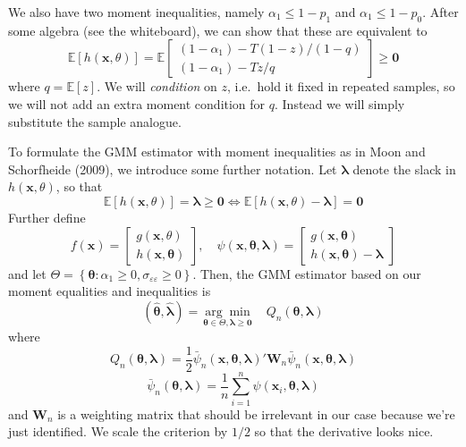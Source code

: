 \documentclass[12pt]{article}
\begin{document}
We also have two moment inequalities, namely $\alpha_1 \leq 1 - p_1$ and $\alpha_1 \leq 1 - p_0$.
After some algebra (see the whiteboard), we can show that these are equivalent to
\[
  \mathbb{E}\left[ h(\mathbf{x},\theta) \right] = \mathbb{E}
  \left[
  \begin{array}{c}
    (1 - \alpha_1) - T(1 - z)/(1 - q)\\
    (1 - \alpha_1) - Tz/q
  \end{array}
\right] \geq \mathbf{0}
\]
where $q = \mathbb{E}[z]$.
We will \emph{condition} on $z$, i.e.\ hold it fixed in repeated samples, so we will not add an extra moment condition for $q$.
Instead we will simply substitute the sample analogue.

To formulate the GMM estimator with moment inequalities as in Moon and Schorfheide (2009), we introduce some further notation.
Let $\boldsymbol{\lambda}$ denote the slack in $h(\mathbf{x}, \theta)$, so that
\[
  \mathbb{E}[h(\mathbf{x},\theta)] = \boldsymbol{\lambda} \geq \mathbf{0} \iff \mathbb{E}[h(\mathbf{x}, \theta) - \boldsymbol{\lambda}] = \mathbf{0}
\]
Further define
\[
  f(\mathbf{x}) = \left[
  \begin{array}{c}
    g(\mathbf{x},\theta) \\ h(\mathbf{x},\boldsymbol{\theta})
  \end{array}
\right], \quad
\psi(\mathbf{x}, \boldsymbol{\theta}, \boldsymbol{\lambda}) = 
\left[
\begin{array}{c}
  g(\mathbf{x}, \boldsymbol{\theta})\\
  h(\mathbf{x}, \boldsymbol{\theta}) - \boldsymbol{\lambda}
\end{array}
\right]
\]
and let $\Theta = \left\{ \boldsymbol{\theta}\colon \alpha_1 \geq 0, \sigma_{\varepsilon\varepsilon}\geq 0 \right\}$.
Then, the GMM estimator based on our moment equalities and inequalities is
\[
  (\widehat{\boldsymbol{\theta}}, \widehat{\boldsymbol{\lambda}}) = \underset{\boldsymbol{\theta} \in \Theta, \boldsymbol{\lambda} \geq \mathbf{0}}{\arg\min} \quad Q_n(\boldsymbol{\theta}, \boldsymbol{\lambda})
\]
where
\[ 
  Q_n(\boldsymbol{\theta}, \boldsymbol{\lambda}) = \frac{1}{2}\bar{\psi}_n(\mathbf{x},\boldsymbol{\theta}, \boldsymbol{\lambda})' \mathbf{W}_n \bar{\psi}_n(\mathbf{x}, \boldsymbol{\theta}, \boldsymbol{\lambda})
\]
\[
  \bar{\psi}_n(\boldsymbol{\theta}, \boldsymbol{\lambda}) = \frac{1}{n}\sum_{i=1}^n \psi(\mathbf{x}_i, \boldsymbol{\theta}, \boldsymbol{\lambda}) 
\]
and $\mathbf{W}_n$ is a weighting matrix that should be irrelevant in our case because we're just identified.
We scale the criterion by $1/2$ so that the derivative looks nice.
\end{document}
